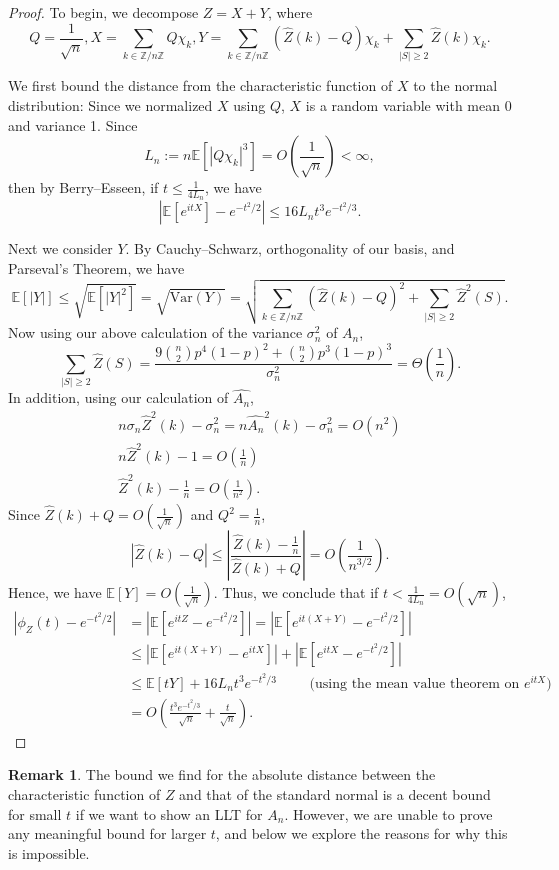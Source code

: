 \documentclass[12pt]{article} %
\newcommand{\p}[1]{\left(#1\right)}
\newcommand{\abs}[1]{\left\lvert#1\right\rvert}
\newcommand{\Var}{\mathrm{Var}}
\newcommand{\E}{\mathbb{E}}
\newcommand{\Z}{\mathbb{Z}}
\theoremstyle{definition}
\theoremstyle{definition}
\newtheorem{remark}[thm]{Remark}
\begin{document}
\begin{proof}
To begin, we decompose $Z = X+Y$, where
\[Q = \frac{1}{\sqrt{n}}, X = \sum_{k \in \Z / n\Z} Q\chi_k, Y = \sum_{k \in \Z / n\Z} (\hat{Z}(k)-Q)\chi_k + \sum_{|S| \geq 2} \hat{Z}(k)\chi_k.\]

We first bound the distance from the characteristic function of $X$ to the normal distribution:
Since we normalized $X$ using $Q$, $X$ is a random variable with mean 0 and variance 1. Since \[L_n := n\E[|Q\chi_k|^3] = O\left(\frac{1}{\sqrt{n}}\right) < \infty, \]
then by Berry--Esseen, if $t \leq \frac{1}{4L_n}$, we have \[|\E[e^{itX}] - e^{-t^2/2}| \leq 16L_{n}t^3e^{-t^2/3}.\]

Next we consider $Y$. By Cauchy--Schwarz, orthogonality of our basis, and Parseval's Theorem, we have 
\[ \E[|Y|] \leq \sqrt{\E[|Y|^2]} = \sqrt{\Var(Y)} = \sqrt{\sum_{k \in \Z / n\Z} (\hat{Z}(k)-Q)^2 + \sum_{|S| \geq 2} \hat{Z}^2(S)}.\]
Now using our above calculation of the variance $\sigma_n^2$ of $A_n$, \[\sum_{|S| \geq 2} {\hat{Z}(S)} = \frac{9{{n}\choose{2}}p^4(1-p)^2+{n\choose2}p^3(1-p)^3}{\sigma_n^2} = \Theta\left(\frac{1}{n}\right).\]
In addition, using our calculation of $\hat{A_n}$,
\begin{align*}
n\sigma_n\hat{Z}^2(k) - \sigma_n^2 = n\hat{A_n}^2(k) - \sigma_n^2 = O(n^2)  \\
n\hat{Z}^2(k) - 1 = O\left(\frac{1}{n} \right) \\
\hat{Z}^2(k) - \frac{1}{n} = O\left(\frac{1}{n^2} \right).
\end{align*}
Since $\hat{Z}(k) + Q = O\left(\frac{1}{\sqrt{n}}\right)$ and $Q^2 = \frac{1}{n}$,
\[ \abs{\hat{Z}(k) - Q} \leq \abs{\frac{\hat{Z}(k) - \frac{1}{n}}{\hat{Z}(k)+Q}} = O\p{\frac{1}{n^{3/2}}}. \]
Hence, we have $\E[Y] = O\left(\frac{1}{\sqrt{n}}\right)$. 
Thus, we conclude that if $t < \frac{1}{4L_n} = O(\sqrt{n})$,
\begin{align*} 
\abs{\phi_Z(t) - e^{-t^2/2}}
&= \abs{\E[e^{itZ}-e^{-t^2/2}]} = \abs{\E[e^{it(X+Y)}-e^{-t^2/2}]} \\
&\leq \abs{\E[e^{it(X+Y)}-e^{itX}]} + \abs{\E[e^{itX}-e^{-t^2/2}]} \\
&\leq \E[tY] + 16L_{n}t^3e^{-t^2/3} \qquad \text{ (using the mean value theorem on } e^{itX})\\
&= O\left(\frac{t^3e^{-t^2/3}}{\sqrt[]{n}} + \frac{t}{\sqrt{n}}\right).
\end{align*}

\end{proof}

\begin{remark}
The bound we find for the absolute distance between the characteristic function of $Z$ and that of the standard normal is a decent bound for small $t$ if we want to show an LLT for $A_n$. However, we are unable to prove any meaningful bound for larger $t$, and below we explore the reasons for why this is impossible.
\end{remark}
\end{document}
